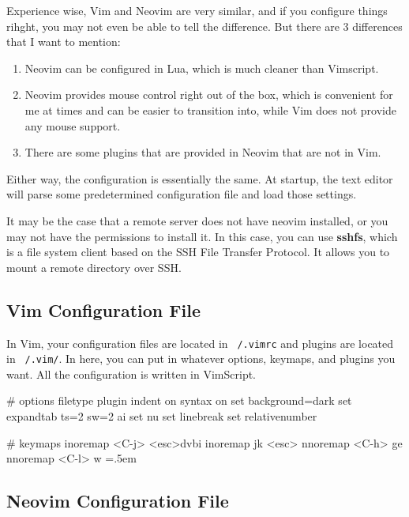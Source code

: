 \documentclass{article}
\theoremstyle{definition}
\newenvironment{cverbatim}
    {\SaveVerbatim{cverb}}
    {\endSaveVerbatim
    \flushleft\fboxrule=0pt\fboxsep=.5em
    \colorbox{cverbbg}{%
      \makebox[\dimexpr\linewidth-2\fboxsep][l]{\BUseVerbatim{cverb}}%
    }
    \endflushleft
  }
\begin{document}
    Experience wise, Vim and Neovim are very similar, and if you configure things rihght, you may not even be able to tell the difference. But there are 3 differences that I want to mention: 
    
    \begin{enumerate}
      \item Neovim can be configured in Lua, which is much cleaner than Vimscript. 
      \item Neovim provides mouse control right out of the box, which is convenient for me at times and can be easier to transition into, while Vim does not provide any mouse support. 
      \item There are some plugins that are provided in Neovim that are not in Vim. 
    \end{enumerate}

    Either way, the configuration is essentially the same. At startup, the text editor will parse some predetermined configuration file and load those settings. 

    It may be the case that a remote server does not have neovim installed, or you may not have the permissions to install it. In this case, you can use \textbf{sshfs}, which is a file system client based on the SSH File Transfer Protocol. It allows you to mount a remote directory over SSH. 

  \subsection{Vim Configuration File}

    In Vim, your configuration files are located in \texttt{~/.vimrc} and plugins are located in \texttt{~/.vim/}. In here, you can put in whatever options, keymaps, and plugins you want. All the configuration is written in VimScript. 

    \begin{cverbatim} 
      # options 
      filetype plugin indent on 
      syntax on 
      set background=dark
      set expandtab ts=2 sw=2 ai
      set nu
      set linebreak 
      set relativenumber        
      
      # keymaps
      inoremap <C-j> <esc>dvbi
      inoremap jk <esc>
      nnoremap <C-h> ge
      nnoremap <C-l> w 
    \end{cverbatim}
      
  \subsection{Neovim Configuration File}
\end{document}
